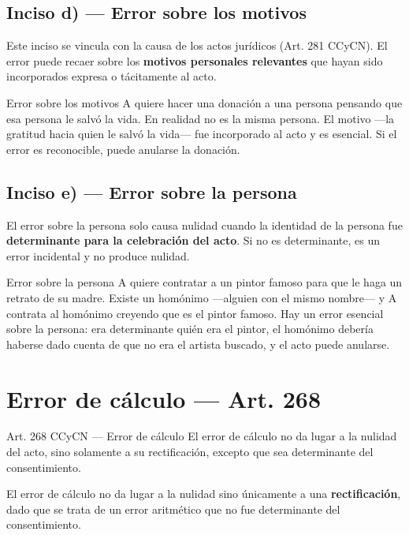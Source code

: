 \documentclass[12pt,oneside]{book}
\begin{document}
\subsection{Inciso d) --- Error sobre los motivos}

Este inciso se vincula con la causa de los actos jurídicos (Art. 281 CCyCN). El error puede recaer sobre los \textbf{motivos personales relevantes} que hayan sido incorporados expresa o tácitamente al acto.

\begin{example}{Error sobre los motivos}
A quiere hacer una donación a una persona pensando que esa persona le salvó la vida. En realidad no es la misma persona. El motivo ---la gratitud hacia quien le salvó la vida--- fue incorporado al acto y es esencial. Si el error es reconocible, puede anularse la donación.
\end{example}

\subsection{Inciso e) --- Error sobre la persona}

El error sobre la persona solo causa nulidad cuando la identidad de la persona fue \textbf{determinante para la celebración del acto}. Si no es determinante, es un error incidental y no produce nulidad.

\begin{example}{Error sobre la persona}
A quiere contratar a un pintor famoso para que le haga un retrato de su madre. Existe un homónimo ---alguien con el mismo nombre--- y A contrata al homónimo creyendo que es el pintor famoso. Hay un error esencial sobre la persona: era determinante quién era el pintor, el homónimo debería haberse dado cuenta de que no era el artista buscado, y el acto puede anularse.
\end{example}

\section{Error de cálculo --- Art. 268}

\begin{articulo}{Art. 268 CCyCN --- Error de cálculo}
El error de cálculo no da lugar a la nulidad del acto, sino solamente a su rectificación, excepto que sea determinante del consentimiento.
\end{articulo}

El error de cálculo no da lugar a la nulidad sino únicamente a una \textbf{rectificación}, dado que se trata de un error aritmético que no fue determinante del consentimiento.
\end{document}
